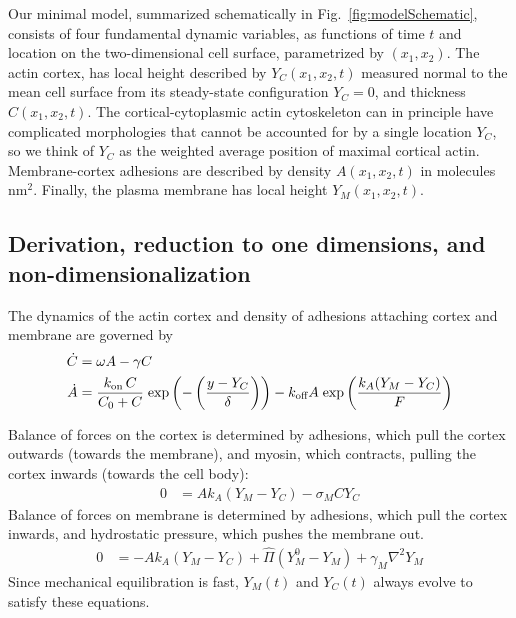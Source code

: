 

Our minimal model, summarized schematically in Fig.~\ref{fig:modelSchematic}, consists of four fundamental dynamic variables, as functions of time $t$ and location on the two-dimensional cell surface, parametrized by $(x_1, x_2)$. The actin cortex, has local height described by $Y_C(x_1,x_2,t)$ measured normal to the mean cell surface from its steady-state configuration $Y_C=0$, and thickness $C(x_1,x_2,t)$. The cortical-cytoplasmic actin cytoskeleton can in principle have complicated morphologies that cannot be accounted for by a single location $Y_C$, so we think of $Y_C$ as the weighted average position of maximal cortical actin. Membrane-cortex adhesions are described by density $A(x_1,x_2,t)$ in molecules $\text{nm}^2$. Finally, the plasma membrane has local height $Y_M(x_1,x_2,t)$.
\subsection{Derivation, reduction to one dimensions, and non-dimensionalization}


The dynamics of the actin cortex and  density of adhesions attaching cortex and membrane are governed by
\begin{align}
\dot{C} &= \omega A - \gamma C \label{eq::CDotequation}\\
\dot{A} &=  \frac{\kon\,C}{C_0+C}\; \mbox{exp}\left( - \left(\frac{y-Y_C}{\delta}\right)\right) - \koff A\; \mbox{exp}\left( \frac{k_A (Y_M-Y_C)}{F}\right)\label{eq::ADotequation}
\end{align}

Balance of forces on the cortex is determined by adhesions, which pull the cortex outwards (towards the membrane), and myosin, which contracts, pulling the cortex inwards (towards the cell body):
\begin{align}
0 &= A k_A (Y_M-Y_C) - \sigma_M C Y_C \label{eq::forceBalanceCortex}
\end{align}
Balance of forces on membrane is determined by adhesions, which pull the cortex inwards, and hydrostatic pressure, which pushes the membrane out. 
\begin{align}
0 &= - Ak_A (Y_M-Y_C) + \hat{\Pi}(Y_M^0 - Y_M) + \gamma_M \nabla^2  Y_M \label{eq::forceBalanceMembrane}
\end{align}
Since mechanical equilibration is fast, $Y_M(t)$ and $Y_C(t)$ always evolve to satisfy these equations.


